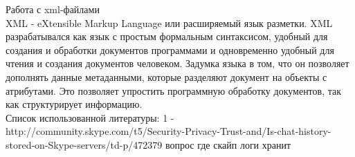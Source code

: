 Работа с xml-файлами \\

XML - eXtensible Markup Language или расширяемый язык разметки. XML разрабатывался как язык с простым формальным синтаксисом, удобный для создания и обработки документов программами и одновременно удобный для чтения и создания документов человеком. Задумка языка в том, что он позволяет дополнять данные метаданными, которые разделяют документ на объекты с атрибутами. Это позволяет упростить программную обработку документов, так как структурирует информацию. \\

Список использованной литературы:
1 -  http://community.skype.com/t5/Security-Privacy-Trust-and/Is-chat-history-stored-on-Skype-servers/td-p/472379 вопрос где скайп логи хранит
